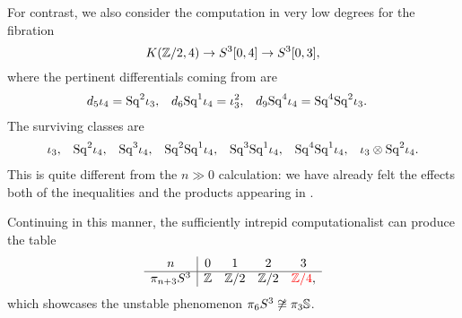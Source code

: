 \begin{remark}\label{UnstableSerresMethodEx}
For contrast, we also consider the computation in very low degrees for the fibration \[K(\Z/2, 4) \to S^3[0, 4] \to S^3[0, 3],\] where the pertinent differentials coming from  are
\begin{align*}
d_5 \iota_4 & = \Sq^2 \iota_3, &
d_6 \Sq^1 \iota_4 & = \iota_3^2, &
d_9 \Sq^4 \iota_4 & = \Sq^4 \Sq^2 \iota_3.
\end{align*}
The surviving classes are
\begin{align*}
\iota_3, & &
\Sq^2 \iota_4, & &
\Sq^3 \iota_4, & &
\Sq^2\Sq^1 \iota_4, & &
\Sq^3\Sq^1 \iota_4, & &
\Sq^4 \Sq^1 \iota_4, & &
\iota_3 \otimes \Sq^2 \iota_4.
\end{align*}
This is quite different from the $n \gg 0$ calculation: we have already felt the effects both of the inequalities and the products appearing in .

Continuing in this manner, the sufficiently intrepid computationalist can produce the table
\[\begin{array}{c|cccc}
n & 0 & 1 & 2 & 3 \\
\hline
\pi_{n+3} S^3 & \Z & \Z/2 & \Z/2 & \textcolor{red}{\Z/4},
\end{array}\]
which showcases the unstable phenomenon $\pi_6 S^3 \not\cong \pi_3 \S$.
\end{remark}





